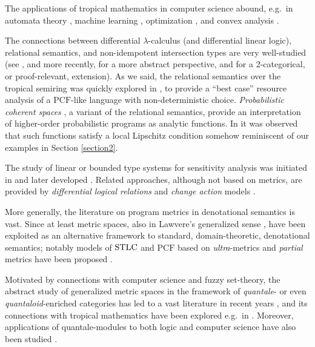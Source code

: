 

The applications of tropical mathematics in computer science abound, e.g.~in automata theory \cite{Chua1992, Simon}, machine learning \cite{Maragos2021, Pachter2004, Zhang2018}, optimization \cite{Akian2011, Akian2012}, and convex analysis \cite{Lucet2009}. 

The connections between differential $\lambda$-calculus (and differential linear logic), relational semantics, and non-idempotent intersection types are very well-studied (see \cite{decarvalho2018}, and more recently, \cite{Mazza2016} for a more abstract perspective, and \cite{Olimpieri2021, Galal2021} for a 2-categorical, or proof-relevant, extension).
As we said, the relational semantics over the tropical semiring was quickly explored in \cite{Manzo2013}, to provide a ``best case'' resource analysis of a $\mathrm{PCF}$-like language with non-deterministic choice. 
\emph{Probabilistic coherent spaces} \cite{Ehrhard2011}, a variant of  the relational semantics, provide an interpretation of higher-order probabilistic programs
as analytic functions. In \cite{Ehrhard2022} it was observed that such functions satisfy a local Lipschitz condition somehow reminiscent of our examples in Section \ref{section2}.


The study of linear or bounded type systems for sensitivity analysis was initiated in \cite{Girard92tcs} and later developed \cite{Schopp, SchoppDalLago, Reed2010}.
Related approaches, although not based on metrics, are provided by \emph{differential logical relations} \cite{dallago} and \emph{change action} models \cite{Picallo2019}.


More generally, the literature on program metrics in denotational semantics is vast. Since at least \cite{VANBREUGEL20011} metric spaces, also in Lawvere's generalized sense \cite{Lawvere1973}, have been exploited as an alternative framework to standard, domain-theoretic, denotational semantics; notably models of $\mathrm{STLC}$ and $\mathrm{PCF}$ based on 
\emph{ultra}-metrics and \emph{partial} metrics have been proposed  \cite{Escardo1999,PistoneLICS, PistoneFSCD2022}.

Motivated by connections with computer science and fuzzy set-theory, 
the abstract study of generalized metric spaces in the framework of \emph{quantale}- or even \emph{quantaloid}-enriched categories has led to a vast literature in recent years \cite{Hofmann2014, Stubbe2014}, 
and its connections with tropical mathematics have been explored e.g.~in \cite{Fuji, Willerton2013}. Moreover, applications of quantale-modules to both logic and computer science have also been studied \cite{Abramsky1993b, Russo2007}.

